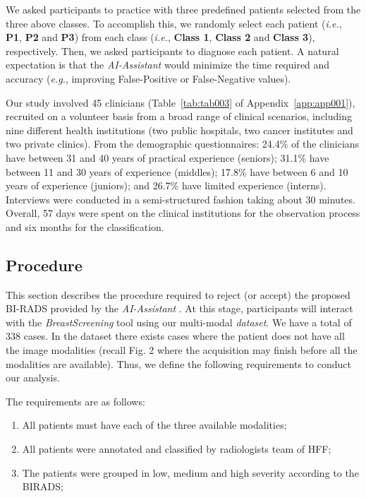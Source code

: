 We asked participants to practice with three predefined patients selected from the three above classes. To accomplish this, we randomly select each patient ({\it i.e.}, {\bf P1}, {\bf P2} and {\bf P3}) from each class ({\it i.e.}, {\bf Class 1}, {\bf Class 2} and {\bf Class 3}), respectively.
Then, we asked participants to diagnose each patient.
A natural expectation is that the {\it AI-Assistant} would minimize the time required and accuracy ({\it e.g.}, improving False-Positive or False-Negative values).

Our study involved 45 clinicians (Table~\ref{tab:tab003} of Appendix~\ref{app:app001}), recruited on a volunteer basis from a broad range of clinical scenarios, including nine different health institutions (two public hospitals, two cancer institutes and two private clinics).
From the demographic questionnaires:
24.4\% of the clinicians have between 31 and 40 years of practical experience (seniors);
31.1\% have between 11 and 30 years of experience (middles);
17.8\% have between 6 and 10 years of experience (juniors); and
26.7\% have limited experience (interns).
Interviews were conducted in a semi-structured fashion taking about 30 minutes.
Overall, 57 days were spent on the clinical institutions for the observation process and six months for the classification.

\subsection{Procedure}
\label{sec:procedure}

This section describes the procedure required to reject (or accept) the proposed BI-RADS provided by the {\it AI-Assistant} \cite{https://doi.org/10.13140/rg.2.2.16566.14403/1}.
At this stage, participants will interact with the {\it Breast\-Screening} tool using our multi-modal {\em dataset}. We have a total of 338 cases. 
In the dataset there exists cases where the patient does not have all the image modalities (recall Fig. 2 where the acquisition may finish before all the modalities are available).
Thus, we define the following requirements to conduct our analysis.

\hfill

\noindent
The requirements are as follows:

\begin{enumerate}
\item All patients must have each of the three available modalities;
\item All patients were annotated and classified by radiologists team of HFF;
\item The patients were grouped in low, medium and high severity according to the BIRADS;
\end{enumerate}

